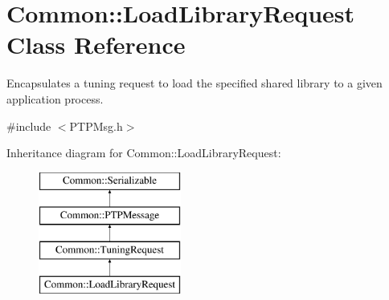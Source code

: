 \hypertarget{class_common_1_1_load_library_request}{\section{Common\-:\-:Load\-Library\-Request Class Reference}
\label{class_common_1_1_load_library_request}
}


Encapsulates a tuning request to load the specified shared library to a given application process.  




{\ttfamily \#include $<$P\-T\-P\-Msg.\-h$>$}

Inheritance diagram for Common\-:\-:Load\-Library\-Request\-:\begin{figure}[H]
\begin{center}
\leavevmode
\includegraphics[height=4.000000cm]{class_common_1_1_load_library_request}
\end{center}
\end{figure}
